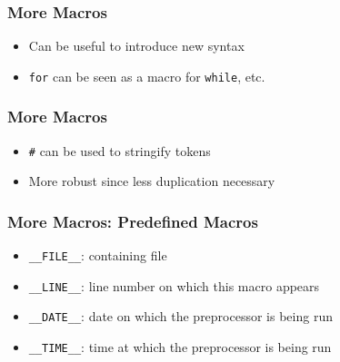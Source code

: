 \documentclass{../ucll-slides}
\begin{document}
\begin{frame}
  \frametitle{More Macros}
  \begin{itemize}
    \item Can be useful to introduce new syntax
    \item {\tt for} can be seen as a macro for {\tt while}, etc.
  \end{itemize}
  \begin{overprint}
  \end{overprint}
\end{frame}

\begin{frame}
  \frametitle{More Macros}
  \begin{itemize}
    \item {\tt \#} can be used to stringify tokens
    \item More robust since less duplication necessary
  \end{itemize}
  \begin{overprint}
  \end{overprint}
\end{frame}

\begin{frame}
  \frametitle{More Macros: Predefined Macros}
  \begin{itemize}
    \item {\tt \_\_FILE\_\_}: containing file
    \item {\tt \_\_LINE\_\_}: line number on which this macro appears
    \item {\tt \_\_DATE\_\_}: date on which the preprocessor is being run
    \item {\tt \_\_TIME\_\_}: time at which the preprocessor is being run
  \end{itemize}
  \begin{overprint}
  \end{overprint}
\end{frame}
\end{document}
